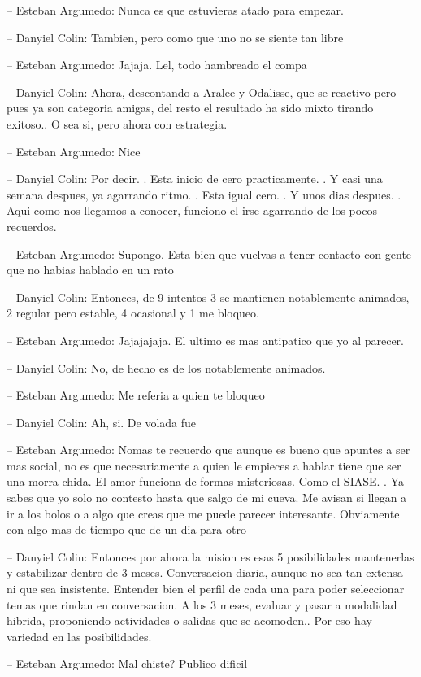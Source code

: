 -- Esteban Argumedo: Nunca es que estuvieras atado para empezar.

-- Danyiel Colin: Tambien, pero como que uno no se siente tan libre

-- Esteban Argumedo: Jajaja. Lel, todo hambreado el compa

-- Danyiel Colin: Ahora, descontando a Aralee y Odalisse, que se
reactivo pero pues ya son categoria amigas, del resto el resultado ha
sido mixto tirando exitoso.. O sea si, pero ahora con estrategia.

-- Esteban Argumedo: Nice

-- Danyiel Colin: Por decir. . Esta inicio de cero practicamente. . Y
casi una semana despues, ya agarrando ritmo. . Esta igual cero. . Y unos
dias despues. . Aqui como nos llegamos a conocer, funciono el irse
agarrando de los pocos recuerdos.

-- Esteban Argumedo: Supongo. Esta bien que vuelvas a tener contacto con
gente que no habias hablado en un rato

-- Danyiel Colin: Entonces, de 9 intentos 3 se mantienen notablemente
animados, 2 regular pero estable, 4 ocasional y 1 me bloqueo.

-- Esteban Argumedo: Jajajajaja. El ultimo es mas antipatico que yo al
parecer.

-- Danyiel Colin: No, de hecho es de los notablemente animados.

-- Esteban Argumedo: Me referia a quien te bloqueo

-- Danyiel Colin: Ah, si. De volada fue

-- Esteban Argumedo: Nomas te recuerdo que aunque es bueno que apuntes a
ser mas social, no es que necesariamente a quien le empieces a hablar
tiene que ser una morra chida. El amor funciona de formas misteriosas.
Como el SIASE. . Ya sabes que yo solo no contesto hasta que salgo de mi
cueva. Me avisan si llegan a ir a los bolos o a algo que creas que me
puede parecer interesante. Obviamente con algo mas de tiempo que de un
dia para otro

-- Danyiel Colin: Entonces por ahora la mision es esas 5 posibilidades
mantenerlas y estabilizar dentro de 3 meses. Conversacion diaria, aunque
no sea tan extensa ni que sea insistente. Entender bien el perfil de
cada una para poder seleccionar temas que rindan en conversacion. A los
3 meses, evaluar y pasar a modalidad hibrida, proponiendo actividades o
salidas que se acomoden.. Por eso hay variedad en las posibilidades.

-- Esteban Argumedo: Mal chiste? Publico dificil

